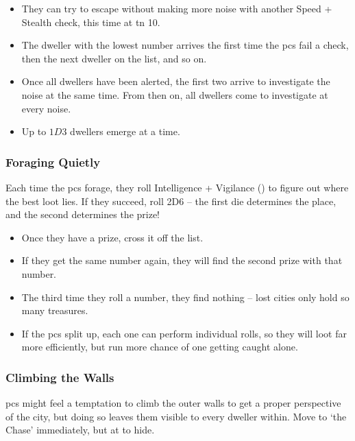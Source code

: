 \begin{multicols}{2}
\begin{itemize}
  \item
  They can try to escape without making more noise with another Speed + Stealth check, this time at \gls{tn} 10.
  \item
  The dweller with the lowest number arrives the first time the \glspl{pc} fail a check, then the next dweller on the list, and so on.
  \item
  Once all dwellers have been alerted, the first two arrive to investigate the noise at the same time.
  From then on, all dwellers come to investigate at every noise.
  \item
  Up to $1D3$ dwellers emerge at a time.
\end{itemize}

\subsubsection{Foraging Quietly}
\label{lostForaging}

Each time the \glspl{pc} forage, they roll Intelligence + Vigilance () to figure out where the best loot lies.
If they succeed, roll 2D6 -- the first die determines the place, and the second determines the prize!

\begin{itemize}
  \item
  Once they have a prize, cross it off the list.
  \item
  If they get the same number again, they will find the second prize with that number.
  \item
  The third time they roll a number, they find nothing -- lost cities only hold so many treasures.
  \item
  If the \glspl{pc} split up, each one can perform individual rolls, so they will loot far more efficiently, but run more chance of one getting caught alone.

\end{itemize}

\subsubsection{Climbing the Walls}

\Glspl{pc} might feel a temptation to climb the outer walls to get a proper perspective of the city, but doing so leaves them visible to every dweller within.
Move to `the Chase' immediately, but at  to hide.

\end{multicols}

\foragingChart

\needspace{12em}
\bigLine

\begin{multicols}{2}

\jelly

\jelly

\jelly

\griffin

\chitincrawler

\demilich

\dragon

\end{multicols}

